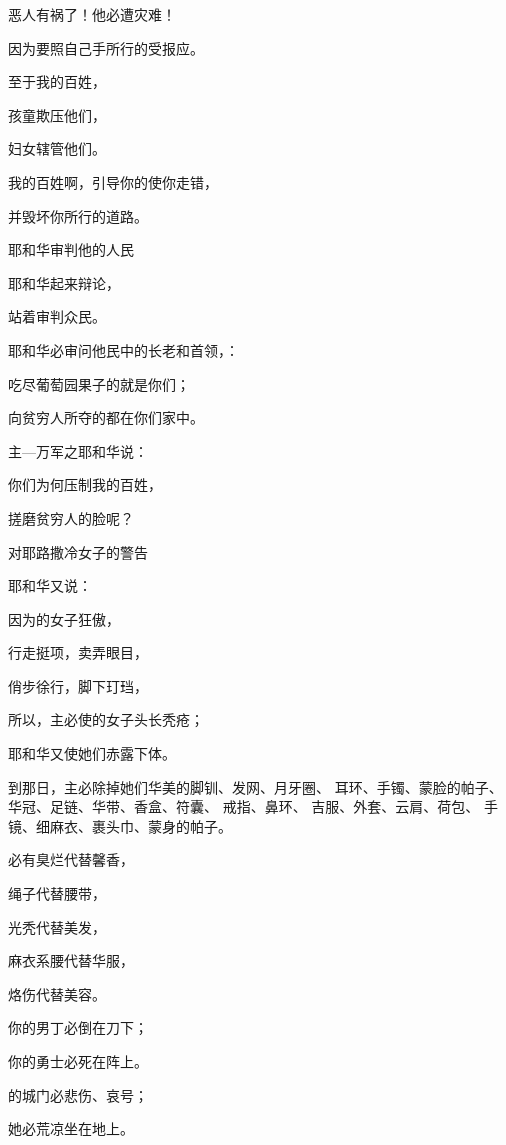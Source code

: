 {\par }{\Q {}恶人有祸了！他必遭灾难！
\par }{\Q 因为要照自己手所行的受报应。
\par }{\Q {}至于我的百姓，
\par }{\Q 孩童欺压他们，
\par }{\Q 妇女辖管他们。
\par }{\Q 我的百姓啊，引导你的使你走错，
\par }{\Q 并毁坏你所行的道路。
\par }{\SH 耶和华审判他的人民
\par }{\Q {}耶和华起来辩论，
\par }{\Q 站着审判众民。
\par }{\Q {}耶和华必审问他民中的长老和首领，{}：
\par }{\Q 吃尽葡萄园果子的就是你们；
\par }{\Q 向贫穷人所夺的都在你们家中。
\par }{\Q {}主—万军之耶和华说：
\par }{\Q 你们为何压制我的百姓，
\par }{\Q 搓磨贫穷人的脸呢？
\par }{\SH 对耶路撒冷女子的警告
\par }{\Q {}耶和华又说：
\par }{\Q 因为{}的女子狂傲，
\par }{\Q 行走挺项，卖弄眼目，
\par }{\Q 俏步徐行，脚下玎珰，
\par }{\Q {}所以，主必使{}的女子头长秃疮；
\par }{\Q 耶和华又使她们赤露下体。
\par }{\PP {}到那日，主必除掉她们华美的脚钏、发网、月牙圈、
耳环、手镯、蒙脸的帕子、
华冠、足链、华带、香盒、符囊、
戒指、鼻环、
吉服、外套、云肩、荷包、
手镜、细麻衣、裹头巾、蒙身的帕子。
\par }{\Q {}必有臭烂代替馨香，
\par }{\Q 绳子代替腰带，
\par }{\Q 光秃代替美发，
\par }{\Q 麻衣系腰代替华服，
\par }{\Q 烙伤代替美容。
\par }{\Q {}你的男丁必倒在刀下；
\par }{\Q 你的勇士必死在阵上。
\par }{\Q {}的城门必悲伤、哀号；
\par }{\Q 她必荒凉坐在地上。

}
